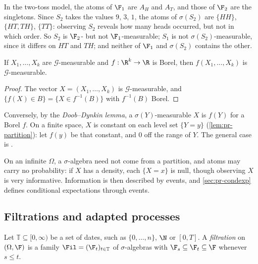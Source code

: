 \begin{example}\label{exa:pr-two-tosses}
In the two-toss model, the atoms of $\F_1$ are $A_H$ and $A_T$, and those of $\F_2$ are the
singletons. Since $S_2$ takes the values $9$, $3$, $1$, the atoms of $\sigma(S_2)$ are
$\{HH\}$, $\{HT,TH\}$, $\{TT\}$: observing $S_2$ reveals how many heads occurred, but not
in which order. So $S_2$ is $\F_2$- but not $\F_1$-measurable; $S_1$ is not
$\sigma(S_2)$-measurable, since it differs on $HT$ and $TH$; and neither of $\F_1$ and
$\sigma(S_2)$ contains the other.
\end{example}

\begin{proposition}\label{prop:pr-functions}
If $X_1,\dots,X_k$ are $\mathcal G$-measurable and $f:\R^k\to\R$ is Borel, then
$f(X_1,\dots,X_k)$ is $\mathcal G$-measurable.
\end{proposition}

\begin{proof}
The vector $X=(X_1,\dots,X_k)$ is $\mathcal G$-measurable, and
$\{f(X)\in B\}=\{X\in f^{-1}(B)\}$ with $f^{-1}(B)$ Borel.
\end{proof}

Conversely, by the \emph{Doob--Dynkin lemma}, a $\sigma(Y)$-measurable $X$ is $f(Y)$ for a
Borel $f$. On a finite space, $X$ is constant on each level set $\{Y=y\}$
(\cref{lem:pr-partition}): let $f(y)$ be that constant, and $0$ off the range of $Y$. The
general case is .

\begin{remark}\label{rem:pr-general}
On an infinite $\Omega$, a $\sigma$-algebra need not come from a partition, and atoms may
carry no probability: if $X$ has a density, each $\{X=x\}$ is null, though observing $X$ is
very informative. Information is then described by events, and \cref{sec:pr-condexp}
defines conditional expectations through events.
\end{remark}

\subsection{Filtrations and adapted processes}

\begin{definition}[Filtration]\label{def:pr-filtration}
Let $\mathbb T\subseteq[0,\infty)$ be a set of dates, such as $\{0,\dots,n\}$, $\N$ or
$[0,T]$. A \emph{filtration} on $(\Omega,\F)$ is a family $\Fil=(\F_t)_{t\in\mathbb T}$ of
$\sigma$-algebras with $\F_s\subseteq\F_t\subseteq\F$ whenever $s\le t$.
\end{definition}

